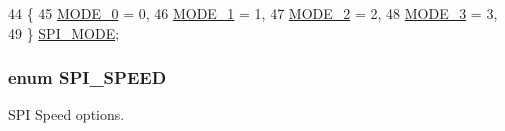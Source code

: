 \begin{DoxyCode}
44              \{
45     \hyperlink{group__spi_ggae506139af46f1328f631ddacd54af96da68ae6cc4ed3f27fe8040eb93d9c4efa3}{MODE\_0} = 0, 
46     \hyperlink{group__spi_ggae506139af46f1328f631ddacd54af96daf25f6bda513005f645d3626d9391f8cc}{MODE\_1} = 1, 
47     \hyperlink{group__spi_ggae506139af46f1328f631ddacd54af96da0a36399f2feba688abe010c193b8a5f1}{MODE\_2} = 2, 
48     \hyperlink{group__spi_ggae506139af46f1328f631ddacd54af96dad94e70da03012c70efde66c9136b0981}{MODE\_3} = 3, 
49 \} \hyperlink{group__spi_gae506139af46f1328f631ddacd54af96d}{SPI\_MODE};
\end{DoxyCode}
\hypertarget{group__spi_ga92b13fd51af2a9a09b1854520a5a427f}{
\subsubsection[{S\-P\-I\-\_\-\-S\-P\-E\-E\-D}]{\setlength{\rightskip}{0pt plus 5cm}enum {\bf S\-P\-I\-\_\-\-S\-P\-E\-E\-D}}}\label{group__spi_ga92b13fd51af2a9a09b1854520a5a427f}


S\-P\-I Speed options. 

